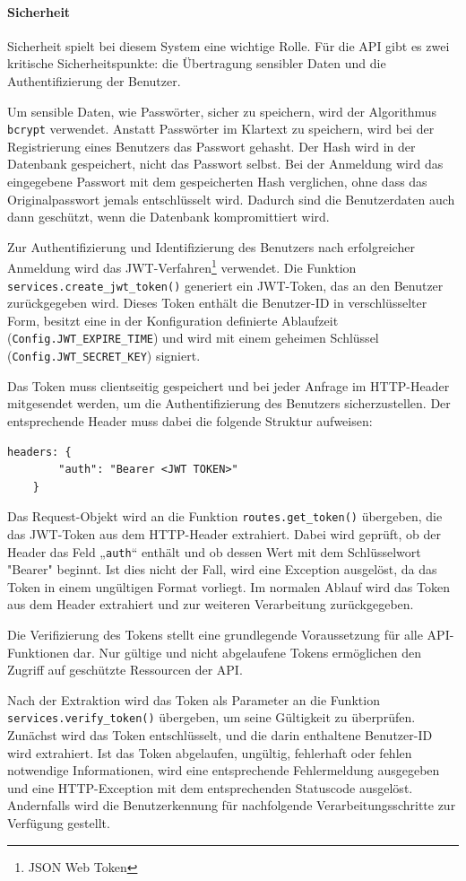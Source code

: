 \documentclass[12pt, letterpaper]{article}
\begin{document}
  \paragraph{Sicherheit}
  \par \textbf{}
  \par Sicherheit spielt bei diesem System eine wichtige Rolle. Für die API gibt es zwei kritische Sicherheitspunkte: die Übertragung sensibler Daten und die Authentifizierung der Benutzer.
  \par Um sensible Daten, wie Passwörter, sicher zu speichern, wird der Algorithmus \texttt{bcrypt} verwendet. Anstatt Passwörter im Klartext zu speichern, wird bei der Registrierung eines Benutzers das Passwort gehasht. Der Hash wird in der Datenbank gespeichert, nicht das Passwort selbst. Bei der Anmeldung wird das eingegebene Passwort mit dem gespeicherten Hash verglichen, ohne dass das Originalpasswort jemals entschlüsselt wird. Dadurch sind die Benutzerdaten auch dann geschützt, wenn die Datenbank kompromittiert wird.
  \par Zur Authentifizierung und Identifizierung des Benutzers nach erfolgreicher Anmeldung wird das JWT-Verfahren\footnote {JSON Web Token} verwendet. Die Funktion \texttt{services.create\_jwt\_token()} generiert ein JWT-Token, das an den Benutzer zurückgegeben wird. Dieses Token enthält die Benutzer-ID in verschlüsselter Form, besitzt eine in der Konfiguration definierte Ablaufzeit (\texttt{Config.JWT\_EXPIRE\_TIME}) und wird mit einem geheimen Schlüssel (\texttt{Config.JWT\_SECRET\_KEY}) signiert.
  \par Das Token muss clientseitig gespeichert und bei jeder Anfrage im HTTP-Header mitgesendet werden, um die Authentifizierung des Benutzers sicherzustellen. Der entsprechende Header muss dabei die folgende Struktur aufweisen:
  \begin{Verbatim}[frame=single]
    headers: {
        "auth": "Bearer <JWT TOKEN>"
    }
  \end{Verbatim}
  \par Das Request-Objekt wird an die Funktion \texttt{routes.get\_token()} übergeben, die das JWT-Token aus dem HTTP-Header extrahiert. Dabei wird geprüft, ob der Header das Feld „\texttt{auth}“ enthält und ob dessen Wert mit dem Schlüsselwort "Bearer" beginnt. Ist dies nicht der Fall, wird eine Exception ausgelöst, da das Token in einem ungültigen Format vorliegt. Im normalen Ablauf wird das Token aus dem Header extrahiert und zur weiteren Verarbeitung zurückgegeben.
  \par Die Verifizierung des Tokens stellt eine grundlegende Voraussetzung für alle API-Funktionen dar. Nur gültige und nicht abgelaufene Tokens ermöglichen den Zugriff auf geschützte Ressourcen der API.
  \par Nach der Extraktion wird das Token als Parameter an die Funktion \texttt{services.verify\_token()} übergeben, um seine Gültigkeit zu überprüfen. Zunächst wird das Token entschlüsselt, und die darin enthaltene Benutzer-ID wird extrahiert.  Ist das Token abgelaufen, ungültig, fehlerhaft oder fehlen notwendige Informationen, wird eine entsprechende Fehlermeldung ausgegeben und eine HTTP-Exception mit dem entsprechenden Statuscode ausgelöst. Andernfalls wird die Benutzerkennung für nachfolgende Verarbeitungsschritte zur Verfügung gestellt.
\end{document}
